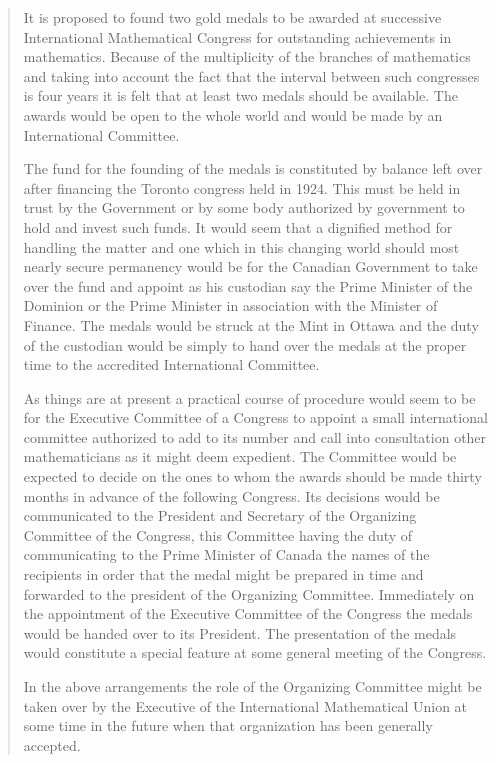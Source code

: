 \begin{quote}
  It is proposed to found two gold medals to be awarded at successive
  International Mathematical Congress for outstanding achievements in
  mathematics. Because of the multiplicity of the branches of
  mathematics and taking into account the fact that the interval between
  such congresses is four years it is felt that at least two medals
  should be available. The awards would be open to the whole world and
  would be made by an International Committee.

  The fund for the founding of the medals is constituted by balance left
  over after financing the Toronto congress held in 1924. This must be
  held in trust by the Government or by some body authorized by
  government to hold and invest such funds. It would seem that a
  dignified method for handling the matter and one which in this
  changing world should most nearly secure permanency would be for the
  Canadian Government to take over the fund and appoint as his custodian
  say the Prime Minister of the Dominion or the Prime Minister in
  association with the Minister of Finance. The medals would be struck
  at the Mint in Ottawa and the duty of the custodian would be simply to
  hand over the medals at the proper time to the accredited
  International Committee.

  As things are at present a practical course of procedure would seem to
  be for the Executive Committee of a Congress to appoint a small
  international committee authorized to add to its number and call into
  consultation other mathematicians as it might deem expedient. The
  Committee would be expected to decide on the ones to whom the awards
  should be made thirty months in advance of the following Congress. Its
  decisions would be communicated to the President and Secretary of the
  Organizing Committee of the Congress, this Committee having the duty
  of communicating to the Prime Minister of Canada the names of the
  recipients in order that the medal might be prepared in time and
  forwarded to the president of the Organizing Committee. Immediately on
  the appointment of the Executive Committee of the Congress the medals
  would be handed over to its President. The presentation of the medals
  would constitute a special feature at some general meeting of the
  Congress.

  In the above arrangements the role of the Organizing Committee might
  be taken over by the Executive of the International Mathematical Union
  at some time in the future when that organization has been generally
  accepted.


\end{quote}
